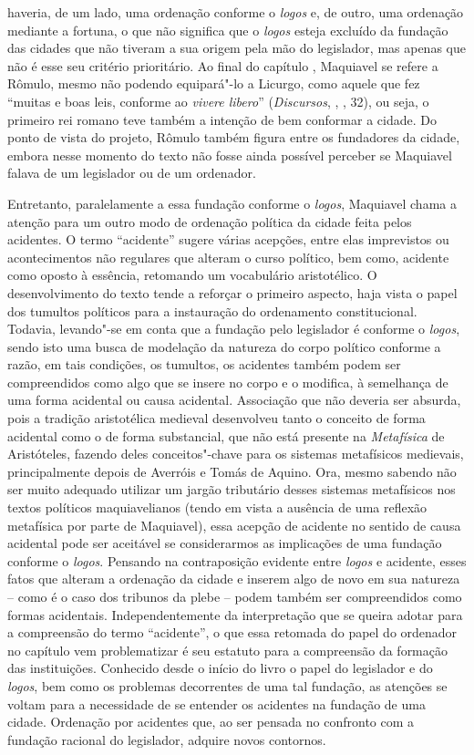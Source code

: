 haveria, de um lado, uma ordenação conforme o \emph{logos} e, de outro,
uma ordenação mediante a fortuna, o que não significa que o \emph{logos}
esteja excluído da fundação das cidades que não tiveram a sua origem
pela mão do legislador, mas apenas que não é esse seu critério
prioritário. Ao final do capítulo , Maquiavel se refere a Rômulo,
mesmo não podendo equipará"-lo a Licurgo, como aquele que fez ``muitas e
boas leis, conforme ao \emph{vivere libero}'' (\emph{Discursos}, , ,
32), ou seja, o primeiro rei romano teve também a intenção de bem
conformar a cidade. Do ponto de vista do projeto, Rômulo também figura
entre os fundadores da cidade, embora nesse momento do texto não fosse
ainda possível perceber se Maquiavel falava de um legislador ou de um
ordenador.

Entretanto, paralelamente a essa fundação conforme o \emph{logos},
Maquiavel chama a atenção para um outro modo de ordenação política da
cidade feita pelos acidentes. O termo ``acidente'' sugere várias
acepções, entre elas imprevistos ou acontecimentos não regulares que
alteram o curso político, bem como, acidente como oposto à essência,
retomando um vocabulário aristotélico. O desenvolvimento do texto tende
a reforçar o primeiro aspecto, haja vista o papel dos tumultos políticos
para a instauração do ordenamento constitucional. Todavia, levando"-se em
conta que a fundação pelo legislador é conforme o \emph{logos}, sendo
isto uma busca de modelação da natureza do corpo político conforme a
razão, em tais condições, os tumultos, os acidentes também podem ser
compreendidos como algo que se insere no corpo e o modifica, à
semelhança de uma forma acidental ou causa acidental. Associação que não
deveria ser absurda, pois a tradição aristotélica medieval desenvolveu
tanto o conceito de forma acidental como o de forma substancial, que não
está presente na \emph{Metafísica} de Aristóteles, fazendo deles
conceitos"-chave para os sistemas metafísicos medievais, principalmente
depois de Averróis e Tomás de Aquino. Ora, mesmo sabendo não ser muito
adequado utilizar um jargão tributário desses sistemas metafísicos nos
textos políticos maquiavelianos (tendo em vista a ausência de uma
reflexão metafísica por parte de Maquiavel), essa acepção de acidente no
sentido de causa acidental pode ser aceitável se considerarmos as
implicações de uma fundação conforme o \emph{logos}. Pensando na
contraposição evidente entre \emph{logos} e acidente, esses fatos que
alteram a ordenação da cidade e inserem algo de novo em sua natureza --
como é o caso dos tribunos da plebe -- podem também ser compreendidos
como formas acidentais. Independentemente da interpretação que se queira
adotar para a compreensão do termo ``acidente'', o que essa retomada do
papel do ordenador no capítulo  vem problematizar é seu estatuto para
a compreensão da formação das instituições. Conhecido desde o início do
livro o papel do legislador e do \emph{logos}, bem como os problemas
decorrentes de uma tal fundação, as atenções se voltam para a
necessidade de se entender os acidentes na fundação de uma cidade.
Ordenação por acidentes que, ao ser pensada no confronto com a fundação
racional do legislador, adquire novos contornos.

